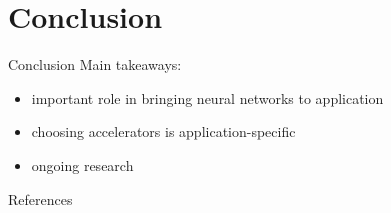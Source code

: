 \documentclass[en]{sdqbeamer}
\begin{document}
	
	\section{Conclusion}
	\begin{frame}{Conclusion}
		Main takeaways:
		\begin{itemize}
			\item important role in bringing neural networks to application
			\item choosing accelerators is application-specific
			\item ongoing research
		\end{itemize}
	\end{frame}

	\appendix
	\beginbackup
	
	\begin{frame}[allowframebreaks]{References}
		\nocite{tpu_picture}
		\printbibliography
	\end{frame}

	\begin{frame}[plain]
		\titlepage
	\end{frame}



	
\end{document}
